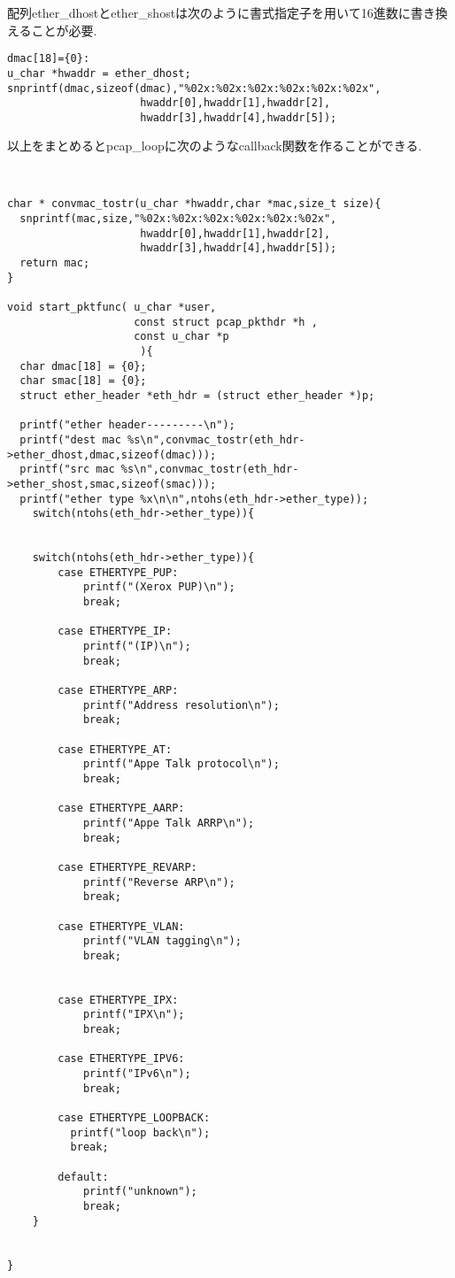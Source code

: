 \documentclass[a4paper]{article}%
\begin{document}
配列ether\_dhostとether\_shostは次のように書式指定子を用いて16進数に書き換えることが必要.
\begin{lstlisting}[caption=hoge,label=hoge]
dmac[18]={0}:
u_char *hwaddr = ether_dhost;
snprintf(dmac,sizeof(dmac),"%02x:%02x:%02x:%02x:%02x:%02x",
                     hwaddr[0],hwaddr[1],hwaddr[2],
                     hwaddr[3],hwaddr[4],hwaddr[5]);
\end{lstlisting}

以上をまとめるとpcap\_loopに次のようなcallback関数を作ることができる.
\begin{lstlisting}[caption=hoge, label=hoge]


char * convmac_tostr(u_char *hwaddr,char *mac,size_t size){
  snprintf(mac,size,"%02x:%02x:%02x:%02x:%02x:%02x",
                     hwaddr[0],hwaddr[1],hwaddr[2],
                     hwaddr[3],hwaddr[4],hwaddr[5]);
  return mac;
}

void start_pktfunc( u_char *user,      
                    const struct pcap_pkthdr *h , 
                    const u_char *p        
                     ){
  char dmac[18] = {0};
  char smac[18] = {0};
  struct ether_header *eth_hdr = (struct ether_header *)p;

  printf("ether header---------\n");
  printf("dest mac %s\n",convmac_tostr(eth_hdr->ether_dhost,dmac,sizeof(dmac)));
  printf("src mac %s\n",convmac_tostr(eth_hdr->ether_shost,smac,sizeof(smac)));
  printf("ether type %x\n\n",ntohs(eth_hdr->ether_type));
    switch(ntohs(eth_hdr->ether_type)){


    switch(ntohs(eth_hdr->ether_type)){
        case ETHERTYPE_PUP:
            printf("(Xerox PUP)\n");
            break;
        
        case ETHERTYPE_IP:
            printf("(IP)\n");
            break;
        
        case ETHERTYPE_ARP:
            printf("Address resolution\n");
            break;

        case ETHERTYPE_AT:
            printf("Appe Talk protocol\n");
            break;

        case ETHERTYPE_AARP:
            printf("Appe Talk ARRP\n");
            break;
        
        case ETHERTYPE_REVARP:
            printf("Reverse ARP\n");
            break;
        
        case ETHERTYPE_VLAN:
            printf("VLAN tagging\n");
            break;


        case ETHERTYPE_IPX:
            printf("IPX\n");
            break;
       
        case ETHERTYPE_IPV6:
            printf("IPv6\n");
            break;

        case ETHERTYPE_LOOPBACK:
          printf("loop back\n");
          break;
          
        default:
            printf("unknown");
            break;
    }


}

\end{lstlisting}
\end{document}
